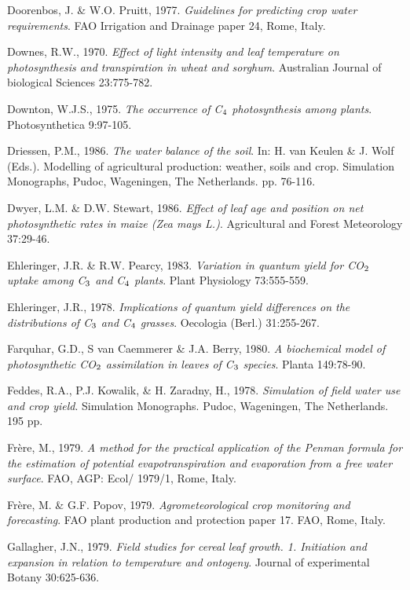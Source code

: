 Doorenbos, J. \& W.O. Pruitt, 1977. {\it Guidelines for predicting crop water requirements\/}.
FAO Irrigation and Drainage paper 24, Rome, Italy.

Downes, R.W., 1970. {\it Effect of light intensity and leaf temperature on photosynthesis and
transpiration in wheat and sorghum\/}. Australian Journal of biological Sciences 23:775-782.

Downton, W.J.S., 1975. {\it The occurrence of C$_{{\rm 4}}$ photosynthesis among plants\/}. Photosynthetica
9:97-105.

Driessen, P.M., 1986. {\it The water balance of the soil\/}. In: H. van Keulen \& J. Wolf (Eds.).
Modelling of agricultural production: weather, soils and crop. Simulation Monographs,
Pudoc, Wageningen, The Netherlands. pp. 76-116.

Dwyer, L.M. \& D.W. Stewart, 1986. {\it Effect of leaf age and position on net photosynthetic
rates in maize (Zea mays L.)\/}. Agricultural and Forest Meteorology 37:29-46.

Ehleringer, J.R. \& R.W. Pearcy, 1983. {\it Variation in quantum yield for CO$_{{\rm 2}}$ uptake among
C$_{{\rm 3}}$ and C$_{{\rm 4}}$ plants\/}. Plant Physiology 73:555-559.

Ehleringer, J.R., 1978. {\it Implications of quantum yield differences on the distributions of C$_{{\rm 3}}$
and C$_{{\rm 4}}$ grasses\/}. Oecologia (Berl.) 31:255-267.

Farquhar, G.D., S van Caemmerer \& J.A. Berry, 1980. {\it A biochemical model of
photosynthetic CO$_{{\rm 2}}$ assimilation in leaves of C$_{{\rm 3}}$ species\/}. Planta 149:78-90.

Feddes, R.A., P.J. Kowalik, \& H. Zaradny, H., 1978. {\it Simulation of field water use and
crop yield\/}. Simulation Monographs. Pudoc, Wageningen, The Netherlands. 195 pp.

Fr\`{e}re, M., 1979. {\it A method for the practical application of the Penman formula for the
estimation of potential evapotranspiration and evaporation from a free water surface\/}. FAO,
AGP: Ecol/ 1979/1, Rome, Italy.

Fr\`{e}re, M. \& G.F. Popov, 1979. {\it Agrometeorological crop monitoring and forecasting\/}. FAO
plant production and protection paper 17. FAO, Rome, Italy.

Gallagher, J.N., 1979. {\it Field studies for cereal leaf growth. 1. Initiation and expansion in
relation to temperature and ontogeny\/}. Journal of experimental Botany 30:625-636.

